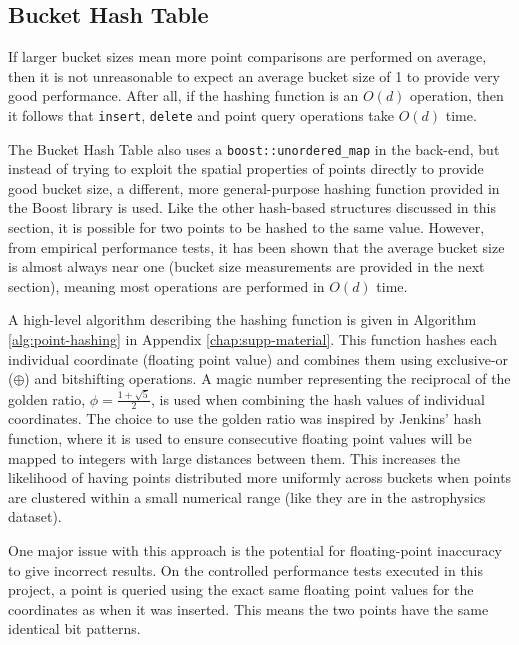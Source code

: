 \subsection{Bucket Hash Table}


If larger bucket sizes mean more point comparisons are performed on average, then it is not unreasonable to expect an average bucket size of 1 to provide very good performance. After all, if the hashing function is an $O(d)$ operation, then it follows that \texttt{insert}, \texttt{delete} and point query operations take $O(d)$ time. 

The Bucket Hash Table also uses a \texttt{boost::unordered\_map} in the back-end, but instead of trying to exploit the spatial properties of points directly to provide good bucket size, a different, more general-purpose hashing function provided in the Boost library is used. Like the other hash-based structures discussed in this section, it is possible for two points to be hashed to the same value. However, from empirical performance tests, it has been shown that the average bucket size is almost always near one (bucket size measurements are provided in the next section), meaning most operations are performed in $O(d)$ time.

A high-level algorithm describing the hashing function is given in Algorithm \ref{alg:point-hashing} in Appendix \ref{chap:supp-material}. This function hashes each individual coordinate (floating point value) and combines them using exclusive-or ($\oplus$) and bitshifting operations. A magic number representing the reciprocal of the golden ratio, $\phi = \frac{1 + \sqrt{5}}{2}$, is used when combining the hash values of individual coordinates. The choice to use the golden ratio was inspired by Jenkins' hash function\cite{hash-combine}, where it is used to ensure consecutive floating point values will be mapped to integers with large distances between them. This increases the likelihood of having points distributed more uniformly across buckets when points are clustered within a small numerical range (like they are in the astrophysics dataset).

One major issue with this approach is the potential for floating-point inaccuracy to give incorrect results. On the controlled performance tests executed in this project, a point is queried using the exact same floating point values for the coordinates as when it was inserted. This means the two points have the same identical bit patterns. 

